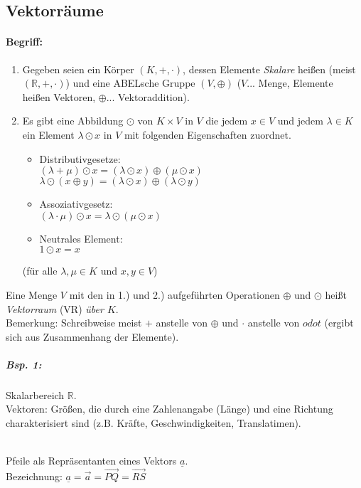 \subsection{Vektorräume} \label{sec:5.1}

\paragraph{Begriff:}
\begin{enumerate}
\item Gegeben seien ein Körper $(K,+,\cdot)$, dessen Elemente \emph{Skalare} heißen (meist $(\mathbb{R}, + ,\cdot)$) und eine ABELsche Gruppe $(V,\oplus)$ ($V$... Menge, Elemente heißen Vektoren, $\oplus$... Vektoraddition).
\item Es gibt eine Abbildung $\odot$ von $K\times V$ in $V$ die jedem $x \in V$ und jedem $\lambda \in K$ ein Element $\lambda \odot x$ in $V$ mit folgenden Eigenschaften zuordnet.
\begin{itemize}
\item Distributivgesetze: \\
$(\lambda + \mu)\odot x = (\lambda \odot x) \oplus (\mu \odot x)$\\
$\lambda\odot(x\oplus y)=(\lambda \odot x) \oplus (\lambda \odot y)$
\item Assoziativgesetz:\\
$(\lambda \cdot \mu ) \odot x = \lambda \odot (\mu \odot x)$
\item Neutrales Element:\\
$1 \odot x = x $
\end{itemize}
(für alle $\lambda, \mu \in K$ und $x,y\in V$)
\end{enumerate}
Eine Menge $V$ mit den in 1.) und 2.) aufgeführten Operationen $\oplus$ und $\odot$ heißt \emph{Vektorraum} (VR) \emph{über $K$}.\\
Bemerkung: Schreibweise meist $+$ anstelle von $\oplus$ und $\cdot$ anstelle von $odot$ (ergibt sich aus Zusammenhang der Elemente).
\subparagraph{Bsp. 1:} \parskp
Skalarbereich $\mathbb{R}$.\\
Vektoren: Größen, die durch eine Zahlenangabe (Länge) und eine Richtung charakterisiert sind (z.B. Kräfte, Geschwindigkeiten, Translatimen).\\
\\
Pfeile als Repräsentanten eines Vektors $\underline{a}$.\\
Bezeichnung: $\underline{a}=\overrightarrow{a}=\overrightarrow{PQ}=\overrightarrow{RS}$
